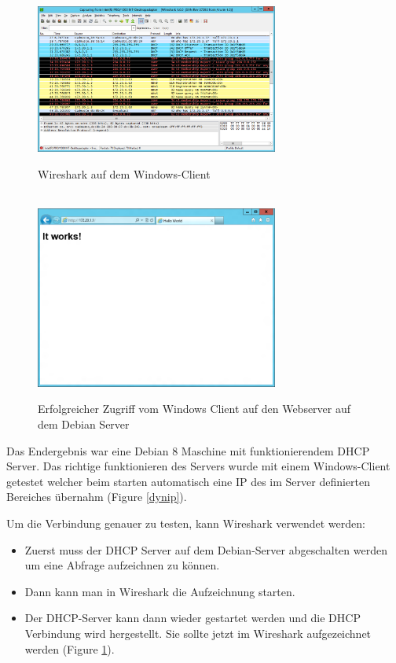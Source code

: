 \documentclass[12pt,a4paper,twoside,titlepage]{article}
\begin{document}
        \begin{figure}
	      \hrulefill\\
	      \center
          \includegraphics[width=8cm]{wireshark_dhcp}
          \caption{\label{wireshark} Wireshark auf dem Windows-Client}
          \hrulefill
        \end{figure}
        \begin{figure}
	      \hrulefill\\
	      \center
          \includegraphics[width=8cm]{ie_web_example}
          \caption{\label{webserver} Erfolgreicher Zugriff vom Windows Client auf den Webserver auf dem Debian Server}
          \hrulefill
        \end{figure}
        
        Das Endergebnis war eine Debian 8 Maschine mit funktionierendem DHCP Server. Das richtige funktionieren des Servers wurde mit einem Windows-Client getestet welcher beim starten automatisch eine IP des im Server definierten Bereiches übernahm (Figure \ref{dynip}).

        Um die Verbindung genauer zu testen, kann Wireshark verwendet werden:
        \begin{itemize}
        \item Zuerst muss der DHCP Server auf dem Debian-Server abgeschalten werden um eine Abfrage aufzeichnen zu können.
        \item Dann kann man in Wireshark die Aufzeichnung starten.
        \item Der DHCP-Server kann dann wieder gestartet werden und die DHCP Verbindung wird hergestellt. Sie sollte jetzt im Wireshark aufgezeichnet werden (Figure \ref{wireshark}).
        \end{itemize}
        
\end{document}
